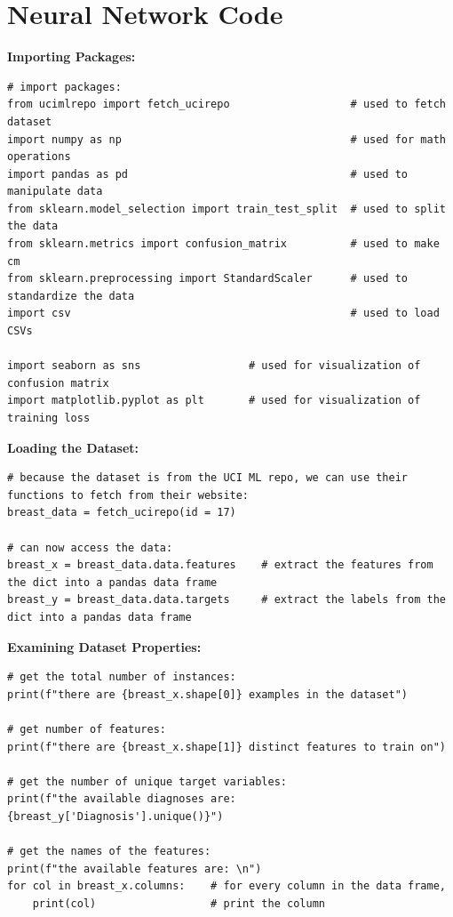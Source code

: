\documentclass[a4paper]{article}
\begin{document}
\newpage
\section{Neural Network Code}
\textbf{Importing Packages:}
\begin{lstlisting}[basicstyle= \scriptsize]
# import packages:
from ucimlrepo import fetch_ucirepo                   # used to fetch dataset
import numpy as np                                    # used for math operations
import pandas as pd                                   # used to manipulate data
from sklearn.model_selection import train_test_split  # used to split the data
from sklearn.metrics import confusion_matrix          # used to make cm
from sklearn.preprocessing import StandardScaler      # used to standardize the data
import csv                                            # used to load CSVs

import seaborn as sns                 # used for visualization of confusion matrix
import matplotlib.pyplot as plt       # used for visualization of training loss
\end{lstlisting} 

\textbf{Loading the Dataset:}
\begin{lstlisting}[basicstyle= \scriptsize]
# because the dataset is from the UCI ML repo, we can use their functions to fetch from their website:
breast_data = fetch_ucirepo(id = 17)

# can now access the data:
breast_x = breast_data.data.features    # extract the features from the dict into a pandas data frame
breast_y = breast_data.data.targets     # extract the labels from the dict into a pandas data frame
\end{lstlisting}

\textbf{Examining Dataset Properties:}
\begin{lstlisting}[basicstyle= \scriptsize]
# get the total number of instances:
print(f"there are {breast_x.shape[0]} examples in the dataset")

# get number of features:
print(f"there are {breast_x.shape[1]} distinct features to train on")

# get the number of unique target variables:
print(f"the available diagnoses are: {breast_y['Diagnosis'].unique()}")

# get the names of the features:
print(f"the available features are: \n")
for col in breast_x.columns:    # for every column in the data frame, 
    print(col)                  # print the column    
\end{lstlisting}
\end{document}

